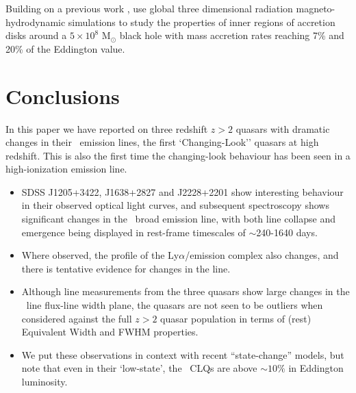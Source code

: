 \documentclass[fleqn,usenatbib]{mnras}
\begin{document}
Building on a previous work \citep[e.g.,][]{JiangYF2014, JiangYF2016, JiangYF2019}, \citet{JiangYF2019arXiv} use global three dimensional radiation magneto-hydrodynamic simulations to study the properties of inner regions of accretion disks around a $5 \times 10^{8}$ M$_{\odot}$ black hole with mass accretion rates reaching 7\% and 20\% of the Eddington value.




\section{Conclusions}
In this paper we have reported on three redshift $z>2$ quasars with
dramatic changes in their \civ\ emission lines, the first
`Changing-Look'' quasars at high redshift.  This is also the first
time the changing-look behaviour has been seen in a high-ionization
emission line.

\begin{itemize}
\item SDSS J1205+3422, J1638+2827 and J2228+2201 show interesting behaviour
  in their observed optical light curves, and subsequent spectroscopy
  shows significant changes in the \civ\ broad emission line, with both
  line collapse and emergence being displayed in rest-frame timescales
  of $\sim$240-1640 days.
\item Where observed, the profile of the Ly$\alpha$/\nv emission complex
  also changes, and there is tentative evidence for changes in the \mgii
  line.
\item Although line measurements from the three quasars show large changes
  in the \civ\ line flux-line width plane, the quasars are not seen to
  be outliers when considered against the full $z>2$ quasar population
  in terms of (rest) Equivalent Width and FWHM properties.
\item 
  We put these observations in context with recent ``state-change''
  models, but note that even in their `low-state', the \civ\ CLQs are
  above $\sim10\%$ in Eddington luminosity.
\end{itemize}
\end{document}
